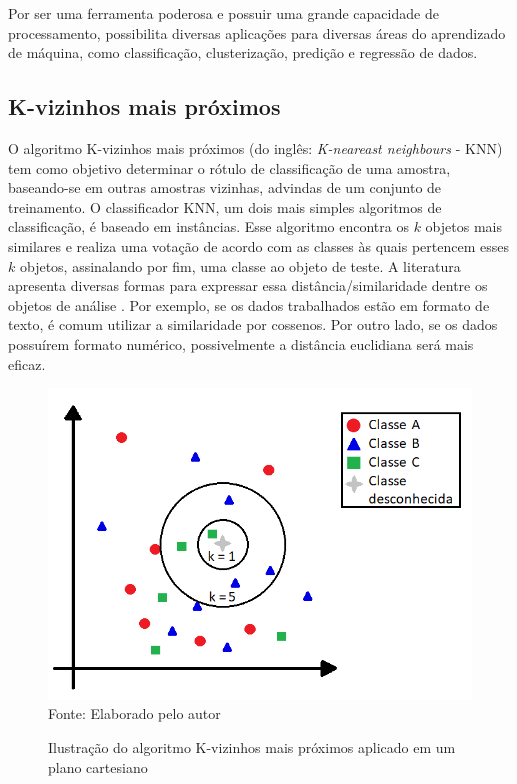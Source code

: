  Por ser uma ferramenta poderosa e possuir uma grande capacidade de processamento, possibilita diversas aplicações para diversas áreas do aprendizado de máquina, como classificação, clusterização, predição e regressão de dados.

\subsection{K-vizinhos mais próximos}
O algoritmo K-vizinhos mais próximos (do inglês: \textit{K-neareast neighbours} - KNN) tem como objetivo determinar o rótulo de classificação de uma amostra, baseando-se em outras amostras vizinhas, advindas de um conjunto de treinamento. O classificador KNN, um dois mais simples algoritmos de classificação, é baseado em
instâncias. Esse algoritmo encontra os $k$ objetos mais similares e realiza uma votação de acordo com as classes às quais pertencem esses $k$ objetos, assinalando por fim, uma classe ao objeto de teste. A literatura apresenta diversas formas para expressar essa distância/similaridade dentre os objetos de análise \citep{fukunaga1975knn, duda1973pattern}. Por exemplo, se os dados trabalhados estão em formato de texto, é comum utilizar a similaridade por cossenos. Por outro lado, se os dados possuírem formato numérico, possivelmente a distância euclidiana será mais eficaz.

\begin{figure}[ht!]
\caption{Ilustração do algoritmo K-vizinhos mais próximos aplicado em um plano cartesiano}
\label{fig:knnExample}
\centering
\includegraphics[scale=0.5]{img/knnExample.png}
{\fontsize{11pt}{\baselineskip}\selectfont
\\Fonte: Elaborado pelo autor
}
\end{figure}

